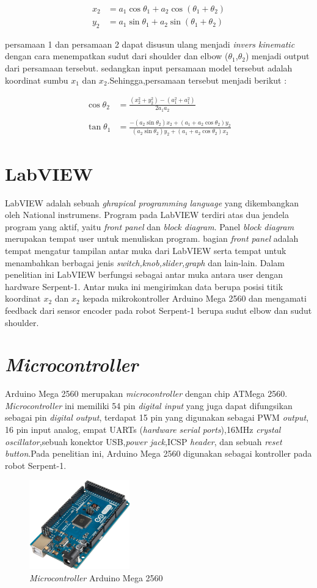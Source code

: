 	\begin{align}
	x_{2}&= a_{1}\cos\theta_{1}+a_{2}\cos(\theta_{1}+\theta_{2})\\
	y_{2}&= a_{1}\sin\theta_{1}+a_{2}\sin(\theta_{1}+\theta_{2})
	\end{align}
	
	persamaan 1 dan persamaan 2 dapat disusun ulang menjadi \textit{invers kinematic} dengan cara menempatkan sudut dari shoulder dan elbow ($\theta_{1}$,$\theta_{2}$) menjadi output dari persamaan tersebut. sedangkan input persamaan model tersebut adalah koordinat sumbu $x_{1}$ dan $x_{2}$.Sehingga,persamaan tersebut menjadi berikut :
	
	\begin{align}
	\cos\theta_{2}&=\frac{(x^{2}_{\mathrm{2}}+y^{2}_{\mathrm{2}})-(a^{2}_{\mathrm{1}}+a^{2}_{\mathrm{1}})}{2a_{1}a_{2}}\\
	\nonumber
	&\\
	\tan\theta_{1}&=\frac{-(a_{2}\sin\theta_{2})x_{2}+(a_{1}+a_{2}\cos\theta_{2})y_{2}}{(a_{2}\sin\theta_{2})y_{2}+(a_{1}+a_{2}\cos\theta_{2})x_{2}}
	\end{align}
	
\section{LabVIEW}
	LabVIEW adalah sebuah \textit{ghrapical programming language} yang dikembangkan oleh National instrumens. Program pada LabVIEW terdiri atas dua jendela program yang aktif, yaitu \textit{front panel} dan \textit{block diagram}. Panel \textit{block diagram} merupakan tempat user untuk menuliskan program. bagian \textit{front panel} adalah tempat mengatur tampilan antar muka dari LabVIEW serta tempat untuk menambahkan berbagai jenis \textit{switch,knob,slider,graph} dan lain-lain. Dalam penelitian ini LabVIEW berfungsi sebagai antar muka antara user dengan hardware Serpent-1. Antar muka ini mengirimkan data berupa posisi titik koordinat $x_{2}$ dan $x_{2}$ kepada mikrokontroller Arduino Mega 2560 dan mengamati feedback dari sensor encoder pada robot Serpent-1 berupa sudut elbow dan sudut shoulder.
\section{\textit{Microcontroller}}
	Arduino Mega 2560 merupakan \textit{microcontroller} dengan chip ATMega 2560. \textit{Microcontroller} ini memiliki 54 pin \textit{digital input} yang juga dapat difungsikan sebagai pin \textit{digital output}, terdapat 15 pin yang digunakan sebagai PWM \textit{output}, 16 pin input analog, empat UARTs (\textit{hardware serial ports}),16MHz \textit{crystal oscillator},sebuah konektor USB,\textit{power jack},ICSP \textit{header}, dan sebuah \textit{reset button}.Pada penelitian ini, Arduino Mega 2560 digunakan sebagai kontroller pada robot Serpent-1.
	
	\begin{figure}[H]
		\centering
		\includegraphics[width=4.33cm]{gambar/arduino_mega.png}
		\caption{\textit{Microcontroller} Arduino Mega 2560}
	\end{figure}